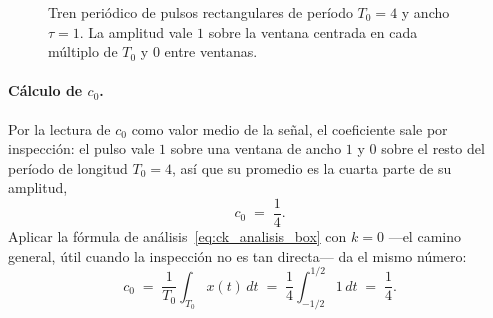 \documentclass[class=book, crop=false]{standalone}
\begin{document}
\begin{figure}[H]
    \centering
    \begin{minipage}{\linewidth}
        \centering
        
        \caption{Tren periódico de pulsos rectangulares de período
                 $T_0 = 4$ y ancho $\tau = 1$. La amplitud vale $1$
                 sobre la ventana centrada en cada múltiplo de $T_0$
                 y $0$ entre ventanas.}
        \label{fig:tren_pulsos}
    \end{minipage}
\end{figure}

\paragraph{Cálculo de $c_0$.}
Por la lectura de $c_0$ como valor medio de la señal, el
coeficiente sale por inspección: el pulso vale $1$ sobre una
ventana de ancho $1$ y $0$ sobre el resto del período de
longitud $T_0=4$, así que su promedio es la cuarta parte de su
amplitud,
\begin{equation*}
    c_0 \;=\; \frac{1}{4}.
\end{equation*}
Aplicar la fórmula de análisis~\eqref{eq:ck_analisis_box} con
$k=0$ ---el camino general, útil cuando la inspección no es tan
directa--- da el mismo número:
\begin{equation*}
    c_0 \;=\; \frac{1}{T_0}\int_{T_0} x(t)\,dt
        \;=\; \frac{1}{4}\int_{-1/2}^{1/2} 1\,dt
        \;=\; \frac{1}{4}.
\end{equation*}
\end{document}
